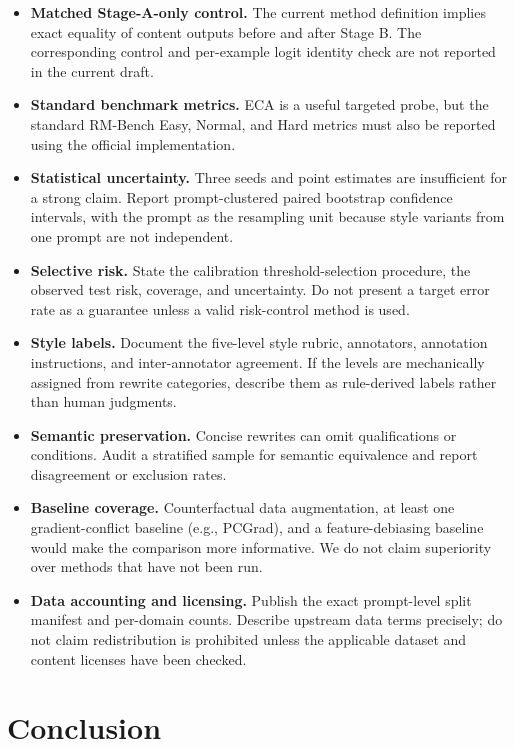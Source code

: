 \documentclass[letterpaper]{article} %
\begin{document}
\begin{itemize}
    \item \textbf{Matched Stage-A-only control.} The current method definition implies exact equality of content outputs before and after Stage B. The corresponding control and per-example logit identity check are not reported in the current draft.
    \item \textbf{Standard benchmark metrics.} ECA is a useful targeted probe, but the standard RM-Bench Easy, Normal, and Hard metrics must also be reported using the official implementation.
    \item \textbf{Statistical uncertainty.} Three seeds and point estimates are insufficient for a strong claim. Report prompt-clustered paired bootstrap confidence intervals, with the prompt as the resampling unit because style variants from one prompt are not independent.
    \item \textbf{Selective risk.} State the calibration threshold-selection procedure, the observed test risk, coverage, and uncertainty. Do not present a target error rate as a guarantee unless a valid risk-control method is used.
    \item \textbf{Style labels.} Document the five-level style rubric, annotators, annotation instructions, and inter-annotator agreement. If the levels are mechanically assigned from rewrite categories, describe them as rule-derived labels rather than human judgments.
    \item \textbf{Semantic preservation.} Concise rewrites can omit qualifications or conditions. Audit a stratified sample for semantic equivalence and report disagreement or exclusion rates.
    \item \textbf{Baseline coverage.} Counterfactual data augmentation, at least one gradient-conflict baseline (e.g., PCGrad), and a feature-debiasing baseline would make the comparison more informative. We do not claim superiority over methods that have not been run.
    \item \textbf{Data accounting and licensing.} Publish the exact prompt-level split manifest and per-domain counts. Describe upstream data terms precisely; do not claim redistribution is prohibited unless the applicable dataset and content licenses have been checked.
\end{itemize}

\section{Conclusion}
\end{document}
